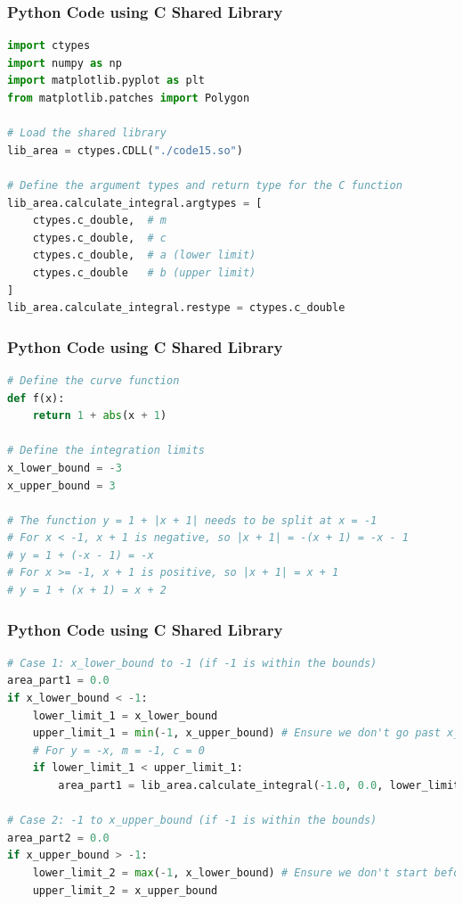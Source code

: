\documentclass{beamer}
\begin{document}
\begin{frame}[fragile]
\frametitle{Python Code using C Shared Library}
\begin{lstlisting}[language=Python]
import ctypes
import numpy as np
import matplotlib.pyplot as plt
from matplotlib.patches import Polygon

# Load the shared library
lib_area = ctypes.CDLL("./code15.so")

# Define the argument types and return type for the C function
lib_area.calculate_integral.argtypes = [
    ctypes.c_double,  # m
    ctypes.c_double,  # c
    ctypes.c_double,  # a (lower limit)
    ctypes.c_double   # b (upper limit)
]
lib_area.calculate_integral.restype = ctypes.c_double
\end{lstlisting}
\end{frame}

\begin{frame}[fragile]
\frametitle{Python Code using C Shared Library}
\begin{lstlisting}[language=Python]
# Define the curve function
def f(x):
    return 1 + abs(x + 1)

# Define the integration limits
x_lower_bound = -3
x_upper_bound = 3

# The function y = 1 + |x + 1| needs to be split at x = -1
# For x < -1, x + 1 is negative, so |x + 1| = -(x + 1) = -x - 1
# y = 1 + (-x - 1) = -x
# For x >= -1, x + 1 is positive, so |x + 1| = x + 1
# y = 1 + (x + 1) = x + 2
\end{lstlisting}
\end{frame}

\begin{frame}[fragile]
\frametitle{Python Code using C Shared Library}
\begin{lstlisting}[language=Python]
# Case 1: x_lower_bound to -1 (if -1 is within the bounds)
area_part1 = 0.0
if x_lower_bound < -1:
    lower_limit_1 = x_lower_bound
    upper_limit_1 = min(-1, x_upper_bound) # Ensure we don't go past x_upper_bound
    # For y = -x, m = -1, c = 0
    if lower_limit_1 < upper_limit_1:
        area_part1 = lib_area.calculate_integral(-1.0, 0.0, lower_limit_1, upper_limit_1)

# Case 2: -1 to x_upper_bound (if -1 is within the bounds)
area_part2 = 0.0
if x_upper_bound > -1:
    lower_limit_2 = max(-1, x_lower_bound) # Ensure we don't start before x_lower_bound
    upper_limit_2 = x_upper_bound
    \end{lstlisting}
\end{frame}
\end{document}
